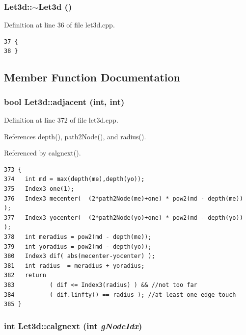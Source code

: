 \subsubsection{\setlength{\rightskip}{0pt plus 5cm}Let3d::$\sim$Let3d ()}\label{classLet3d_b2dea69683e4c627d67f9de0f72909c1_b2dea69683e4c627d67f9de0f72909c1}




Definition at line 36 of file let3d.cpp.

\footnotesize\begin{verbatim}37 {
38 }
\end{verbatim}\normalsize 




\subsection{Member Function Documentation}
\subsubsection{\setlength{\rightskip}{0pt plus 5cm}bool Let3d::adjacent (int, int)}\label{classLet3d_a20d0c310a6e8d02f6295983c199c06f_a20d0c310a6e8d02f6295983c199c06f}




Definition at line 372 of file let3d.cpp.

References depth(), path2Node(), and radius().

Referenced by calgnext().

\footnotesize\begin{verbatim}373 {
374   int md = max(depth(me),depth(yo));
375   Index3 one(1);
376   Index3 mecenter(  (2*path2Node(me)+one) * pow2(md - depth(me))  );
377   Index3 yocenter(  (2*path2Node(yo)+one) * pow2(md - depth(yo))  );
378   int meradius = pow2(md - depth(me));
379   int yoradius = pow2(md - depth(yo));
380   Index3 dif( abs(mecenter-yocenter) );
381   int radius  = meradius + yoradius;
382   return
383          ( dif <= Index3(radius) ) && //not too far
384          ( dif.linfty() == radius ); //at least one edge touch
385 }
\end{verbatim}\normalsize 


\subsubsection{\setlength{\rightskip}{0pt plus 5cm}int Let3d::calgnext (int {\em g\-Node\-Idx})}\label{classLet3d_a57baa80b52cce7a3e0430c3bd3e6107_a57baa80b52cce7a3e0430c3bd3e6107}



